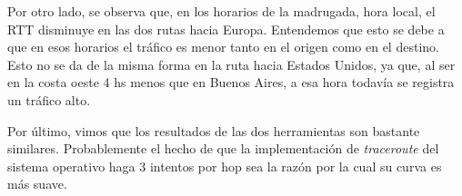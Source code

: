 Por otro lado, se observa que, en los horarios de la madrugada, hora local, el
RTT disminuye en las dos rutas hacia Europa. Entendemos que esto se debe a que
en esos horarios el tráfico es menor tanto en el origen como en el destino.
Esto no se da de la misma forma en la ruta hacia Estados Unidos, ya que, al
ser en la costa oeste 4 hs menos que en Buenos Aires, a esa hora todavía se
registra un tráfico alto.

Por último, vimos que los resultados de las dos herramientas son bastante
similares. Probablemente el hecho de que la implementación de
\emph{traceroute} del sistema operativo haga 3 intentos por hop sea la razón
por la cual su curva es más suave.
